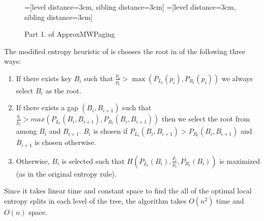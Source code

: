 \documentclass[letterpaper,12pt,titlepage,oneside,final]{book}
\theoremstyle{plain}
\begin{document}
\begin{figure}[H]

=[level distance=3cm, sibling distance=3cm]
=[level distance=3cm, sibling distance=3cm]

\begin{center}
\scriptsize
{}

\caption{Part 1. of ApproxMWPaging}
\end{center}
\end{figure}


The modified entropy heuristic of is chooses the root in of the following three ways:

\begin{enumerate}[label=\alph*)]
\item If there exists key $B_i$ such that $\frac{p_i}{p_t} > \max(P_{L_t}(p_i), P_{R_t}(p_i))$ we always select $B_i$ as the root.

\item If there exists a gap $(B_i, B_{i+1})$ such that $\frac{q_i}{p_t} > max(P_{L_t}(B_i, B_{i+1}), P_{R_t}(B_i, B_{i+1}))$ then we select the root from among $B_i$ and $B_{i+1}$. $B_i$ is chosen if $P_{L_t}(B_i, B_{i+1}) > P_{R_t}(B_i, B_{i+1})$ and $B_{i+1}$ is chosen otherwise.

\item Otherwise, $B_i$ is selected such that $H(P_{L_t}(B_i), \frac{p_i}{p_t}, P_{R_t}(B_i))$ is maximized (as in the original entropy rule).

\end{enumerate}

Since it takes linear time and constant space to find the all of the optimal local entropy splits in each level of the tree, the algorithm takes $O(n^2)$ time and $O(n)$ space.
\end{document}
